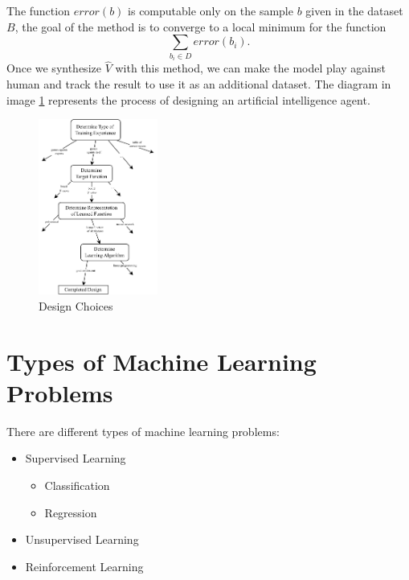 \documentclass[10pt, letterpaper]{report}
\begin{document}
The function $error(b)$ is computable only on the sample $b$ given in the dataset $B$, the goal of the method is to converge to a local minimum for the function  \begin{equation}
    \sum_{b_i\in D}error(b_i).
\end{equation}
Once we synthesize $\hat V$ with this method, we can make the model play against human and track the result to use it as an additional dataset. The diagram in image \ref{img:DesignChoice} represents the process of designing an artificial intelligence agent.

\begin{figure}[h!]
    \centering
    \includegraphics[width=0.35\textwidth]{images/DesignChoice.pdf}
    \caption{Design Choices}
    \label{img:DesignChoice}
\end{figure}
\section{Types of Machine Learning Problems}
There are different types of machine learning problems:\begin{itemize}
    \item Supervised Learning\begin{itemize}
        \item Classification
        \item Regression
    \end{itemize}
    \item Unsupervised Learning
    \item Reinforcement Learning
\end{itemize}
\end{document}
